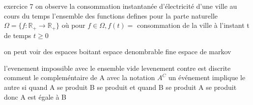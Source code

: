 \documentclass{article}
\begin{document}
exercice 7
on observe la consommation instantanée d'électricité d'une ville au cours du temps
l'ensemble des functions defines pour la parte naturelle
$\Omega = \{ f : \mathbb{R}_{+} \to \mathbb{R}_{+} \}$ où pour $f \in \Omega, f(t) =$ consommation de la ville à l'instant t de temps $t\geq 0$

on peut voir des espaces boitant espace denombrable fine
espace de markov

l'evenement impossible avec le ensemble vide
levenement contre est discrite comment le compleméntaire de A avec la notation $A^{C}$
un événement implique le autre si quand A se produit B se produit et quand B se produit A se produit donc A est égale à B

\end{document}
